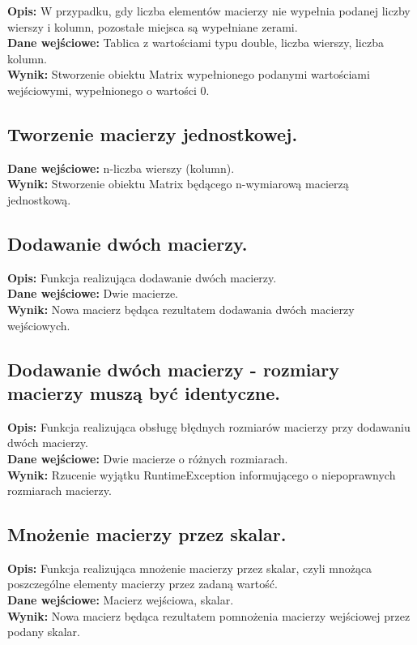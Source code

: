 \documentclass[a4paper,12pt,twoside]{article}
\begin{document}
\textbf{Opis:} W przypadku, gdy liczba elementów macierzy nie wypełnia podanej liczby wierszy
i kolumn, pozostałe miejsca są wypełniane zerami.\\
\textbf{Dane wejściowe:} Tablica z wartościami typu double, liczba wierszy, liczba kolumn.\\
\textbf{Wynik:} Stworzenie obiektu Matrix wypełnionego podanymi wartościami wejściowymi, wypełnionego
o wartości 0.

\subsection{Tworzenie macierzy jednostkowej.}

\textbf{Dane wejściowe:} n-liczba wierszy (kolumn).\\
\textbf{Wynik:} Stworzenie obiektu Matrix będącego n-wymiarową macierzą jednostkową.

\subsection{Dodawanie dwóch macierzy.}

\textbf{Opis:} Funkcja realizująca dodawanie dwóch macierzy.\\
\textbf{Dane wejściowe:} Dwie macierze.\\
\textbf{Wynik:} Nowa macierz będąca rezultatem dodawania dwóch macierzy wejściowych.

\subsection{Dodawanie dwóch macierzy - rozmiary macierzy muszą być identyczne.}

\textbf{Opis:} Funkcja realizująca obsługę błędnych rozmiarów macierzy przy dodawaniu dwóch macierzy.\\
\textbf{Dane wejściowe:} Dwie macierze o różnych rozmiarach.\\
\textbf{Wynik:} Rzucenie wyjątku RuntimeException informującego o niepoprawnych rozmiarach macierzy.

\subsection{Mnożenie macierzy przez skalar.}

\textbf{Opis:} Funkcja realizująca mnożenie macierzy przez skalar, czyli mnożąca poszczególne
elementy macierzy przez zadaną wartość.\\
\textbf{Dane wejściowe:} Macierz wejściowa, skalar.\\
\textbf{Wynik:} Nowa macierz będąca rezultatem pomnożenia macierzy wejściowej przez podany skalar.
\end{document}
